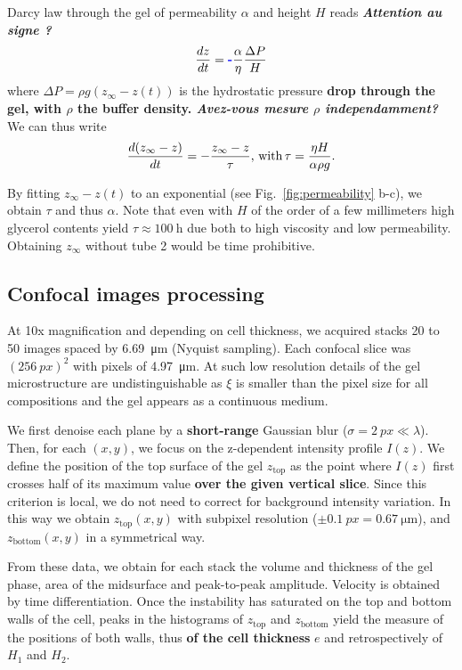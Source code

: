 \documentclass[twocolumn,superscriptaddress,showpacs,preprintnumbers,
amsmath,amssymb,prl]{revtex4-1}
\newcommand{\seb}[1]{\textbf{\color{blue}#1}} %
\begin{document}
Darcy law through the gel of permeability $\alpha$ and height $H$ reads \seb{\it Attention au signe ?} 
\begin{equation}
\frac{dz}{dt} = \seb{-} \frac{\alpha}{\eta}\frac{\Delta P}{H}
\end{equation}
where $\Delta P=\rho g(z_\infty-z(t))$ is the hydrostatic pressure \seb{drop through the gel, with $\rho$ the buffer density. {\it Avez-vous mesure $\rho$ independamment?}} We can thus write
\begin{equation}
\frac{d(z_\infty-z)}{dt} = -\frac{z_\infty-z}{\tau}\text{, with\,} \tau = \frac{\eta H}{\alpha \rho g}.
\end{equation}

By fitting $z_\infty-z(t)$ to an exponential (see Fig.~\ref{fig:permeability} b-c), we obtain $\tau$ and thus $\alpha$. Note that even with $H$ of the order of a few millimeters high glycerol contents yield $\tau\approx \SI{100}{\hour}$ due both to high viscosity and low permeability. Obtaining $z_\infty$ without tube 2 would be time prohibitive.

\subsection*{Confocal images processing}

At 10x magnification and depending on cell thickness, we acquired stacks 20 to 50 images spaced by \SI{6.69}{\micro\metre} (Nyquist sampling). Each confocal slice was $(\SI{256}{px})^2$ with pixels of \SI{4.97}{\micro\metre}. At such low resolution details of the gel microstructure are undistinguishable as $\xi$ is smaller than the pixel size for all compositions and the gel appears as a continuous medium.

We first denoise each plane by a \seb{short-range} Gaussian blur ($\sigma=\SI{2}{px}\ll\lambda$). Then, for each $(x,y)$, we focus on the z-dependent intensity profile $I(z)$. We define the position of the top surface of the gel $z_\text{top}$ as the point where $I(z)$ first crosses half of its maximum value \seb{over the given vertical slice}. Since this criterion is local, we do not need to correct for background intensity variation. In this way we obtain $z_\text{top}(x,y)$ with subpixel resolution ($\pm\SI{0.1}{px}=\SI{0.67}{\micro\metre}$), and $z_\text{bottom}(x,y)$ in a symmetrical way.

From these data, we obtain for each stack the volume and thickness of the gel phase, area of the midsurface and peak-to-peak amplitude. Velocity is obtained by time differentiation. Once the instability has saturated on the top and bottom walls of the cell, peaks in the histograms of $z_\text{top}$ and $z_\text{bottom}$ yield the measure of the positions of both walls, thus \seb{of the cell thickness} $e$ and retrospectively of $H_1$ and $H_2$.
\end{document}
